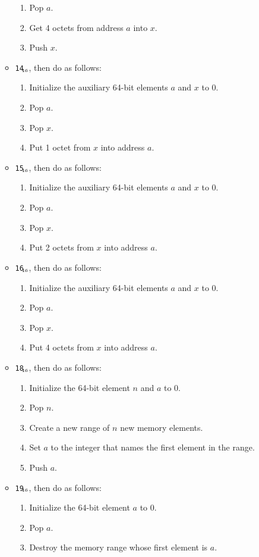 \documentclass[a4paper,12pt]{article}
\newcommand{\num}[1]{\texttt{#1}\xspace}
\newcommand{\hex}[1]{\num{#1}$_{\textup{\tiny\hskip-1ex 16}}$\xspace}
\newcommand{\op}[1]{#1}
\newcommand{\STOREB}    [1]{\op{\hex{14}}}
\newcommand{\STORES}    [1]{\op{\hex{15}}}
\newcommand{\STOREI}    [1]{\op{\hex{16}}}
\newcommand{\ALLOCATE}  [1]{\op{\hex{18}}}
\newcommand{\DEALLOCATE}[1]{\op{\hex{19}}}
\begin{document}
\begin{enumerate}
\begin{itemize}
\begin{enumerate}
    \item Pop $a$.
    \item Get 4 octets from address $a$ into $x$.
    \item Push $x$.
    \end{enumerate}
  \item \STOREB{}, then do as follows:
    \begin{enumerate}
    \item Initialize the auxiliary 64-bit elements $a$ and $x$ to 0.
    \item Pop $a$.
    \item Pop $x$.
    \item Put 1 octet from $x$ into address $a$.
    \end{enumerate}
  \item \STORES{}, then do as follows:
    \begin{enumerate}
    \item Initialize the auxiliary 64-bit elements $a$ and $x$ to 0.
    \item Pop $a$.
    \item Pop $x$.
    \item Put 2 octets from $x$ into address $a$.
    \end{enumerate}
  \item \STOREI{}, then do as follows:
    \begin{enumerate}
    \item Initialize the auxiliary 64-bit elements $a$ and $x$ to 0.
    \item Pop $a$.
    \item Pop $x$.
    \item Put 4 octets from $x$ into address $a$.
    \end{enumerate}
  \item \ALLOCATE{}, then do as follows:
    \begin{enumerate}
    \item Initialize the 64-bit element $n$ and $a$ to 0.
    \item Pop $n$.
    \item Create a new range of $n$ new memory elements.
    \item Set $a$ to the integer that names the first element in the range.
    \item Push $a$.
    \end{enumerate}
  \item \DEALLOCATE{}, then do as follows:
    \begin{enumerate}
    \item Initialize the 64-bit element $a$ to 0.
    \item Pop $a$.
    \item Destroy the memory range whose first element is $a$.
    \end{enumerate}
  \end{itemize}
\end{enumerate}
\end{document}
